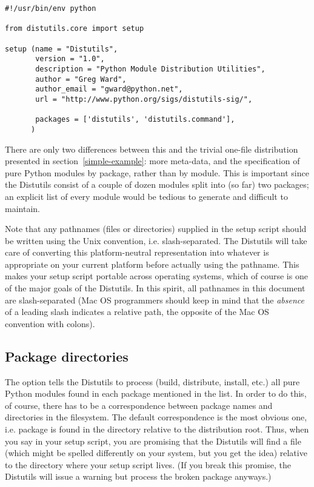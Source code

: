 \documentclass{howto}
\begin{document}
\begin{verbatim}
#!/usr/bin/env python

from distutils.core import setup

setup (name = "Distutils",
       version = "1.0",
       description = "Python Module Distribution Utilities",
       author = "Greg Ward",
       author_email = "gward@python.net",
       url = "http://www.python.org/sigs/distutils-sig/",

       packages = ['distutils', 'distutils.command'],
      )
\end{verbatim}
There are only two differences between this and the trivial one-file
distribution presented in section~\ref{simple-example}: more
meta-data, and the specification of pure Python modules by package,
rather than by module.  This is important since the Distutils consist of
a couple of dozen modules split into (so far) two packages; an explicit
list of every module would be tedious to generate and difficult to
maintain.

Note that any pathnames (files or directories) supplied in the setup
script should be written using the Unix convention, i.e.
slash-separated.  The Distutils will take care of converting this
platform-neutral representation into whatever is appropriate on your
current platform before actually using the pathname.  This makes your
setup script portable across operating systems, which of course is one
of the major goals of the Distutils.  In this spirit, all pathnames in
this document are slash-separated (Mac OS programmers should keep in
mind that the \emph{absence} of a leading slash indicates a relative
path, the opposite of the Mac OS convention with colons).


\subsection{Package directories}
\label{package-dirs}

The  option tells the Distutils to process (build,
distribute, install, etc.) all pure Python modules found in each package
mentioned in the  list.  In order to do this, of
course, there has to be a correspondence between package names and
directories in the filesystem.  The default correspondence is the most
obvious one, i.e. package  is found in the directory
 relative to the distribution root.  Thus, when you say
 in your setup script, you are promising that
the Distutils will find a file  (which might
be spelled differently on your system, but you get the idea) relative to
the directory where your setup script lives.  (If you break this
promise, the Distutils will issue a warning but process the broken
package anyways.)
\end{document}
